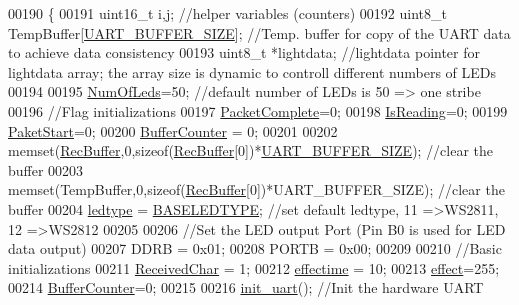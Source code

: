 \begin{DoxyCode}
{00190 \{
00191     uint16\_t i,j;                           \textcolor{comment}{//helper variables (counters)}
00192     uint8\_t TempBuffer[\hyperlink{globals_8h_a0d57378e32bf8278011460740bc29f7f}{UART\_BUFFER\_SIZE}];   \textcolor{comment}{//Temp. buffer for copy of the UART data to
       achieve data consistency    }
00193     uint8\_t *lightdata;                     \textcolor{comment}{//lightdata pointer for lightdata array; the array size is
       dynamic to controll different numbers of LEDs}
00194     
00195     \hyperlink{globals_8h_ad5db4045aed262ed4aae2af9d81fab98}{NumOfLeds}=50;                          \textcolor{comment}{//default number of LEDs is 50 => one stribe}
00196     \textcolor{comment}{//Flag initializations}
00197     \hyperlink{globals_8h_a1b09d1a5bcf4c8ab435bb3c9e36def59}{PacketComplete}=0;                         
00198     \hyperlink{globals_8h_a922ad5baed647eca43ad1a979e162ebd}{IsReading}=0;
00199     \hyperlink{globals_8h_aaa3bddd2273257ac5ec259197b62e984}{PaketStart}=0; 
00200     \hyperlink{globals_8h_aa6fcb4d4fca4554ac73bef10668c23cd}{BufferCounter} = 0;
00201 
00202     memset(\hyperlink{globals_8h_a5d735865707e6694a8173d629e0b4d5c}{RecBuffer},0,\textcolor{keyword}{sizeof}(\hyperlink{globals_8h_a5d735865707e6694a8173d629e0b4d5c}{RecBuffer}[0])*\hyperlink{globals_8h_a0d57378e32bf8278011460740bc29f7f}{UART\_BUFFER\_SIZE});    \textcolor{comment}{//clear
       the buffer  }
00203     memset(TempBuffer,0,\textcolor{keyword}{sizeof}(\hyperlink{globals_8h_a5d735865707e6694a8173d629e0b4d5c}{RecBuffer}[0])*UART\_BUFFER\_SIZE);    \textcolor{comment}{//clear the buffer}
00204     \hyperlink{globals_8h_a722e1eb38b661d1338ada3cc7a4049a0}{ledtype} = \hyperlink{globals_8h_af07a5ce170c7be13d096843960e7b9da}{BASELEDTYPE};                    \textcolor{comment}{//set default ledtype, 11 =>WS2811, 12
       =>WS2812}
00205     
00206     \textcolor{comment}{//Set the LED output Port (Pin B0 is used for LED data output)}
00207     DDRB = 0x01;                        
00208     PORTB = 0x00;
00209 
00210     \textcolor{comment}{//Basic initializations}
00211     \hyperlink{globals_8h_ab5490074aaca289e986e9a00e0c25663}{ReceivedChar} = 1;
00212     \hyperlink{globals_8h_ac2445d316b2972d381edeac44bb6a226}{effectime} = 10;
00213     \hyperlink{globals_8h_a053b8e1f039c19251b90d60317db8aed}{effect}=255;
00214     \hyperlink{globals_8h_aa6fcb4d4fca4554ac73bef10668c23cd}{BufferCounter}=0;
00215     
00216     \hyperlink{ws2811lichterkette_8c_ac7b3df0fa68526d64c732d5f916e34b1}{init\_uart}();                           \textcolor{comment}{//Init the hardware UART}
}
\end{DoxyCode}

